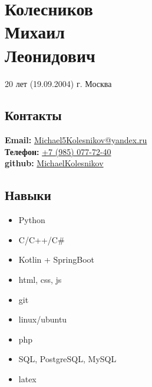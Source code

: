 \documentclass[14pt]{extarticle}
\begin{document}
\noindent
\begin{minipage}{0.35\textwidth} %
      \section*{Колесников \\ Михаил \\ Леонидович}
      20 лет (19.09.2004)
      г. Москва
      \vspace{2cm}
      \subsection*{Контакты}
      \textbf{Email:} \href{mailto:Michael5Kolesnikov@yandex.ru}{Michael5Kolesnikov@yandex.ru} \\
      \textbf{Телефон:} \href{tel:+79850777240}{+7 (985) 077-72-40} \\
      \textbf{github:} \href{https://github.com/MichaelKolesnikov}{MichaelKolesnikov} \\

      \vspace{2cm}

      \subsection*{Навыки}
      \begin{itemize}
            \item Python
            \item C/C++/C\#
            \item Kotlin + SpringBoot
            \item html, css, js
            \item git
            \item linux/ubuntu
            \item php
            \item SQL, PostgreSQL, MySQL
            \item latex
      \end{itemize}

\end{minipage}
\hfill
\vline %
\hfill
\end{document}
